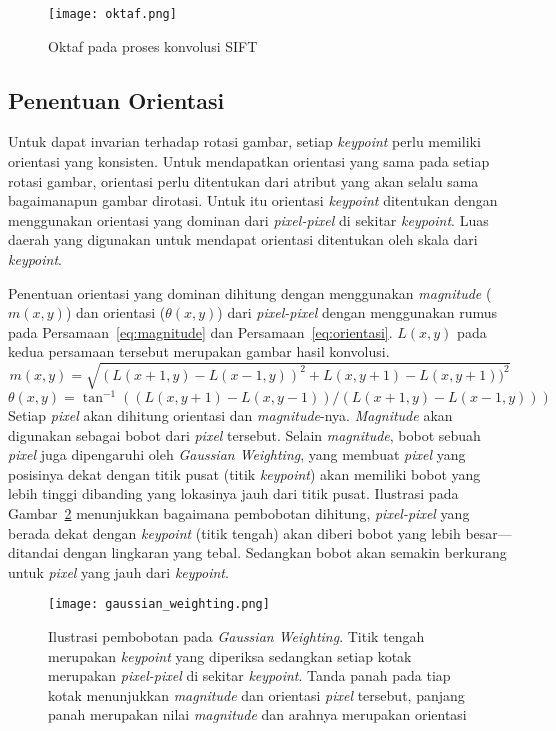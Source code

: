 \begin{figure}[H]
	\centering
	\texttt{[image: oktaf.png]}
	\caption{Oktaf pada proses konvolusi SIFT}
	\label{fig:oktaf}
\end{figure}

\subsection{Penentuan Orientasi}
Untuk dapat invarian terhadap rotasi gambar, setiap \textit{keypoint} perlu memiliki orientasi yang konsisten. Untuk mendapatkan orientasi yang sama pada setiap rotasi gambar, orientasi perlu ditentukan dari atribut yang akan selalu sama bagaimanapun gambar dirotasi. Untuk itu orientasi \textit{keypoint} ditentukan dengan menggunakan orientasi yang dominan dari \textit{pixel-pixel} di sekitar \textit{keypoint}. Luas daerah yang digunakan untuk mendapat orientasi ditentukan oleh skala dari \textit{keypoint}. 

Penentuan orientasi yang dominan dihitung dengan menggunakan \textit{magnitude} ($m(x,y)$) dan orientasi ($\theta(x,y)$) dari \textit{pixel-pixel} dengan menggunakan rumus pada Persamaan~\ref{eq:magnitude} dan Persamaan~\ref{eq:orientasi}. $L(x,y)$ pada kedua persamaan tersebut merupakan gambar hasil konvolusi.
\begin{equation}
	\label{eq:magnitude}
	m(x,y)=\sqrt{(L(x+1,y)-L(x-1,y))^{2}+L(x,y+1)-L(x,y+1))^{2}}
\end{equation}
\begin{equation}
	\label{eq:orientasi}
	\theta(x,y)=\tan^{-1}((L(x,y+1)-L(x,y-1))/(L(x+1,y)-L(x-1,y)))
\end{equation}
Setiap \textit{pixel} akan dihitung orientasi dan \textit{magnitude}-nya. \textit{Magnitude} akan digunakan sebagai bobot dari \textit{pixel} tersebut. Selain \textit{magnitude}, bobot sebuah \textit{pixel} juga dipengaruhi oleh \textit{Gaussian Weighting}, yang membuat \textit{pixel} yang posisinya dekat dengan titik pusat (titik \textit{keypoint}) akan memiliki bobot yang lebih tinggi dibanding yang lokasinya jauh dari titik pusat. Ilustrasi pada Gambar~\ref{fig:gaussian_weighting} menunjukkan bagaimana pembobotan dihitung, \textit{pixel-pixel} yang berada dekat dengan \textit{keypoint} (titik tengah) akan diberi bobot yang lebih besar---ditandai dengan lingkaran yang tebal. Sedangkan bobot akan semakin berkurang untuk \textit{pixel} yang jauh dari \textit{keypoint}.

\begin{figure}[H]
	\centering
	\texttt{[image: gaussian\_weighting.png]}
	\caption{Ilustrasi pembobotan pada \textit{Gaussian Weighting}. Titik tengah merupakan \textit{keypoint} yang diperiksa sedangkan setiap kotak merupakan \textit{pixel-pixel} di sekitar \textit{keypoint}. Tanda panah pada tiap kotak menunjukkan \textit{magnitude} dan orientasi \textit{pixel} tersebut, panjang panah merupakan nilai \textit{magnitude} dan arahnya merupakan orientasi}
	\label{fig:gaussian_weighting}
\end{figure} 

